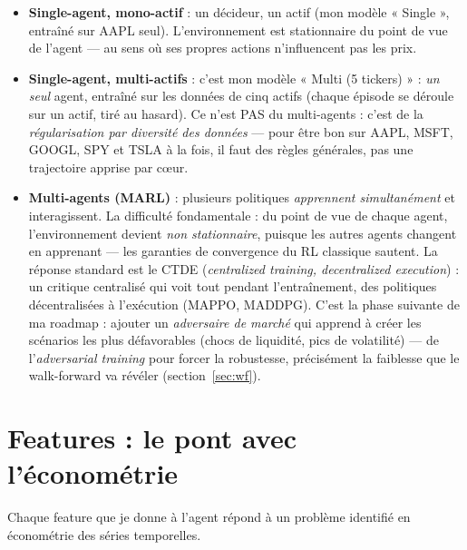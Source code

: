 \documentclass[11pt,a4paper]{article}
\begin{document}
\begin{itemize}[itemsep=3pt]
  \item \textbf{Single-agent, mono-actif} : un décideur, un actif (mon modèle
        « Single », entraîné sur AAPL seul). L'environnement est stationnaire du point
        de vue de l'agent --- au sens où ses propres actions n'influencent pas les prix.
  \item \textbf{Single-agent, multi-actifs} : c'est mon modèle « Multi (5 tickers) » :
        \emph{un seul} agent, entraîné sur les données de cinq actifs (chaque épisode se
        déroule sur un actif, tiré au hasard). Ce n'est PAS du multi-agents : c'est de la
        \emph{régularisation par diversité des données} --- pour être bon sur AAPL, MSFT,
        GOOGL, SPY et TSLA à la fois, il faut des règles générales, pas une trajectoire
        apprise par c\oe ur.
  \item \textbf{Multi-agents (MARL)} : plusieurs politiques \emph{apprennent
        simultanément} et interagissent. La difficulté fondamentale : du point de vue de
        chaque agent, l'environnement devient \emph{non stationnaire}, puisque les autres
        agents changent en apprenant --- les garanties de convergence du RL classique
        sautent. La réponse standard est le CTDE (\emph{centralized training,
        decentralized execution}) : un critique centralisé qui voit tout pendant
        l'entraînement, des politiques décentralisées à l'exécution (MAPPO, MADDPG).
        C'est la phase suivante de ma roadmap : ajouter un \emph{adversaire de marché}
        qui apprend à créer les scénarios les plus défavorables (chocs de liquidité,
        pics de volatilité) --- de l'\emph{adversarial training} pour forcer la
        robustesse, précisément la faiblesse que le walk-forward va révéler
        (section~\ref{sec:wf}).
\end{itemize}

\section{Features : le pont avec l'économétrie}
\label{sec:features}

Chaque feature que je donne à l'agent répond à un problème identifié en économétrie des
séries temporelles.
\end{document}
